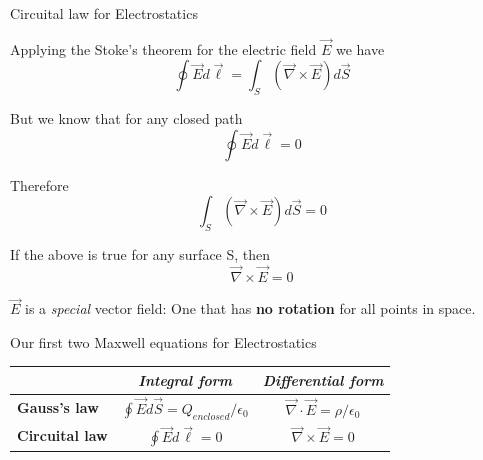 \begin{frame}{Circuital law for Electrostatics}

Applying the Stoke's theorem for the electric field $\vec{E}$ we have
\begin{equation*}
    \oint \vec{E} d\vec{\ell} = \int_{S} (\vec{\nabla} \times \vec{E}) d\vec{S}
\end{equation*}

But we know that for any closed path
\begin{equation*}
    \oint \vec{E} d\vec{\ell} = 0
\end{equation*}

Therefore
\begin{equation*}
    \int_{S} (\vec{\nabla} \times \vec{E}) d\vec{S} = 0
\end{equation*}

If the above is true for any surface S, then
\begin{equation*}
    \vec{\nabla} \times \vec{E} = 0
\end{equation*}

$\vec{E}$ is a {\em special} vector field: One that has {\bf no rotation} for all points in space.

\end{frame}


%
%
%

\begin{frame}{Our first two Maxwell equations for Electrostatics}

\begin{center}
 {\Large
  \begin{table}[H]
    \begin{tabular}{|l|c|c|}
      \hline
          & {\it Integral form} & {\it Differential form} \\
      \hline
      {\bf Gauss's law} &
        $\oint \vec{E} d\vec{S} = Q_{enclosed} / \epsilon_0$ &
        $\vec{\nabla} \cdot \vec{E} = \rho / \epsilon_0$ \\

      {\bf Circuital law} &
        $\oint \vec{E} d\vec{\ell} = 0$ &
        $\vec{\nabla} \times \vec{E} = 0$ \\
      \hline
    \end{tabular}
  \end{table}
 }
\end{center}

\end{frame}


%
%
%

